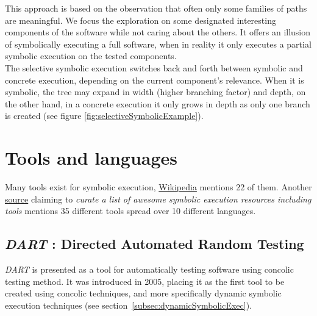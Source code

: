 \documentclass[11pt, conference]{IEEEtran}
\begin{document}
    		This approach is based on the observation that often only some families of paths are meaningful\cite{chipounov2012s2e}. We focus the exploration on some designated interesting components of the software while not caring about the others. It offers an illusion of symbolically executing a full software, when in reality it only executes a partial symbolic execution on the tested components.\\

    		The selective symbolic execution switches back and forth between symbolic and concrete execution, depending on the current component's relevance. When it is symbolic, the tree may expand in width (higher branching factor) and depth, on the other hand, in a concrete execution it only grows in depth as only one branch is created (see figure \ref{fig:selectiveSymbolicExample}).


  \section{Tools and languages}
  	Many tools exist for symbolic execution, \href{https://en.wikipedia.org/wiki/Symbolic_execution\#Tools}{Wikipedia} mentions 22 of them. Another \href{https://github.com/ksluckow/awesome-symbolic-execution\#tools}{source} claiming to \emph{curate a list of awesome symbolic execution resources including tools} mentions 35 different tools spread over 10 different languages.\\

    \subsection{\emph{DART} : Directed Automated Random Testing}
    \label{subsec:DART}
    	\emph{DART} is presented as a tool for automatically testing software using concolic testing method. It was introduced in 2005, placing it as the first tool to be created using concolic techniques, and more specifically dynamic symbolic execution techniques (see section~\ref{subsec:dynamicSymbolicExec}). \\
\end{document}
